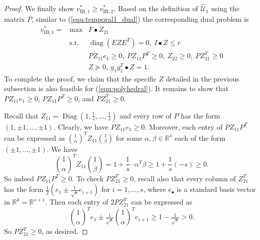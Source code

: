 \documentclass[12pt]{article}
\DeclareMathOperator{\st}{s.t.}
\DeclareMathOperator{\diag}{diag}
\DeclareMathOperator{\Diag}{Diag}
\newcommand{\K}{\widehat{\mathcal{U}}}
\newcommand{\IB}{\mathrm{IB}}
\def\RR{{\mathbb{R}}}
\begin{document}
\begin{onehalfspace}
\begin{proof}
We finally show $v_{\IB,1}^* \ge v_{\IB,2}^*$. Based on
the definition of $\K_1$ using the matrix $P$, similar to
(\ref{equ:temporal1_dual}) the corresponding dual problem is
\begin{equation} \label{equ:polyhedral}
\begin{array}{lll}
v_{\IB,1}^* = & \max & F \bullet Z_{21} \\
& \st & \diag (E Z E^T) = 0, \ I \bullet Z \le r \\
& & PZ_{11}e_1 \ge 0, \ PZ_{11}P^T \ge 0, \ Z_{22} \ge 0, \ P Z_{21}^T \ge 0 \\
& & Z \succeq 0, \ g_1g_1^T \bullet Z = 1.
\end{array}
\end{equation}
To complete the proof, we claim that the specific $Z$ detailed in the
previous subsection is also feasible for (\ref{equ:polyhedral}). It
remains to show that $PZ_{11}e_1 \ge 0$, $PZ_{11}P^T \ge 0$, and $PZ_{21}^T \ge 0$.

Recall that $Z_{11} = \Diag(1, \tfrac1s, \ldots, \tfrac1s)$ and every row of
$P$ has the form $(1, \pm 1, \ldots, \pm 1)$. Clearly, we have  $PZ_{11}e_1 \ge 0$.
Moreover, each entry of $PZ_{11}P^T$ can be expressed as ${1 \choose \alpha}^T Z_{11} {1 \choose \beta}$ for some
$\alpha, \beta \in \RR^s$ each of the form $(\pm 1, \ldots, \pm 1)$. We have
\[
    \textstyle{{1 \choose \alpha}}^T Z_{11} {1 \choose \beta} =
    1 + \frac1s \cdot \alpha^T \beta \ge 1 + \frac1s (-s) \ge 0.
\]
So indeed $PZ_{11}P^T \ge 0$. To check $PZ_{21}^T \ge 0$, recall
also that every column of $Z_{21}^T$ has the form $\tfrac12 (e_1 \pm
\tfrac{1}{\sqrt{s}} e_{i+1})$ for $i=1,\ldots,s$, where $e_{\bullet}$ is a
standard basis vector in $\RR^k = \RR^{s+1}$. Then each entry of $2 P Z_{21}^T$
can be expressed as
\[
    \textstyle{{1 \choose \alpha}}^T e_1 \pm \tfrac{1}{\sqrt{s}} {1 \choose \alpha}^T e_{i+1}
    \ge 1 - \tfrac{1}{\sqrt{s}} > 0.
\]
So $PZ_{21}^T \ge 0$, as desired.
\end{proof}



\end{onehalfspace}
\end{document}
